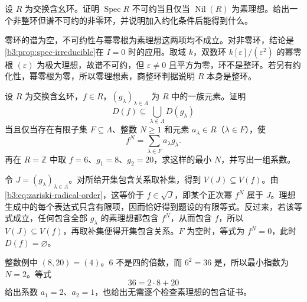 \begin{exercise}\label{b3:ex:01-irreducible-not-domain}
	设 \(R\) 为交换含幺环。证明 \(\operatorname{Spec}R\) 不可约当且仅当 \(\operatorname{Nil}(R)\) 为素理想。给出一个非整环但谱不可约的非零环，并说明加入约化条件后能得到什么。
\end{exercise}
\begin{solution}
	零环的谱为空，不可约性与幂零根为素理想这两项均不成立。对非零环，结论是\cref{b3:prop:spec-irreducible}在 \(I=0\) 时的应用。取域 \(k\)，双数环 \(k[\varepsilon]/(\varepsilon^2)\) 的幂零根 \((\varepsilon)\) 为极大理想，故谱不可约，但 \(\varepsilon\ne0\) 且平方为零，环不是整环。若另有约化性，幂零根为零，所以零理想素，商整环判据说明 \(R\) 本身是整环。
\end{solution}

\begin{exercise}\label{b3:ex:01-basic-open-certificate}
	设 \(R\) 为交换含幺环，\(f\in R\)，\((g_\lambda)_{\lambda\in\Lambda}\) 为 \(R\) 中的一族元素。证明
	\[
		D(f)\subseteq\bigcup_{\lambda\in\Lambda}D(g_\lambda)
	\]
	当且仅当存在有限子集 \(F\subseteq\Lambda\)、整数 \(N\ge1\) 和元素 \(a_\lambda\in R\)（\(\lambda\in F\)），使
	\[
		f^N=\sum_{\lambda\in F}a_\lambda g_\lambda.
	\]
	再在 \(R=\mathbb Z\) 中取 \(f=6\)、\(g_1=8\)、\(g_2=20\)，求这样的最小 \(N\)，并写出一组系数。
\end{exercise}
\begin{solution}
	令 \(J=(g_\lambda)_{\lambda\in\Lambda}\)。对所给开集包含关系取补集，得到 \(V(J)\subseteq V(f)\)。由\eqref{b3:eq:zariski-radical-order}，这等价于 \(f\in\sqrt J\)，即某个正次幂 \(f^N\) 属于 \(J\)。理想生成中的每个表达式只含有限项，因而恰好得到题设的有限等式。反过来，若该等式成立，任何包含全部 \(g_\lambda\) 的素理想都包含 \(f^N\)，从而包含 \(f\)，所以 \(V(J)\subseteq V(f)\)，再取补集便得开集包含关系。\(F\) 为空时，等式为 \(f^N=0\)，此时 \(D(f)=\varnothing\)。

	整数例中 \((8,20)=(4)\)。\(6\) 不是四的倍数，而 \(6^2=36\) 是，所以最小指数为 \(N=2\)。等式
	\[
		36=2\cdot8+20
	\]
	给出系数 \(a_1=2\)、\(a_2=1\)，也给出无需逐个检查素理想的包含证书。
\end{solution}

